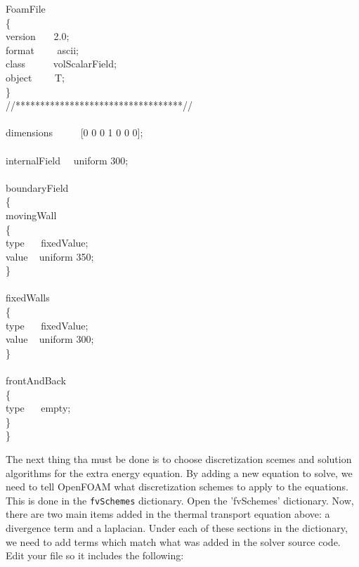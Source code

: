 \documentclass{article}
\newcommand\tab[1][0.5cm]{\hspace*{#1}}
\begin{document}
\begin{enumerate}[2.1]
\begin{myframe}
{	FoamFile\\
	\{\\
		\tab version\tab ~~~ 2.0;\\
		\tab format\tab ~~~~ ascii;\\
		\tab class\tab ~~~~~ volScalarField; \\
		\tab object\tab ~~~~ T; \\
	\} \\
	//**********************************// \\
	\\
	dimensions\tab\tab ~~~~~ [0 0 0 1 0 0 0];\\
	\\
	internalField\tab\tab ~~  uniform 300;\\
	\\
	boundaryField\\
	\{\\
	\tab movingWall\\
	\tab \{\\
		\tab \tab type \tab \tab   \tab ~~  fixedValue;\\
		\tab \tab value \tab \tab   \tab ~  uniform 350;\\
	\tab \}\\
	\\
	\tab fixedWalls\\
	\tab \{\\
		\tab \tab type    \tab \tab \tab  ~~ fixedValue;\\
		\tab \tab value  \tab \tab \tab  ~  uniform 300;\\
	\tab\}\\
	\\
	\tab frontAndBack\\
	\tab \{\\
		\tab \tab type   \tab \tab \tab   ~~  empty;\\
	\tab \}\\
	\}\\
	
	}
\end{myframe}
	
	
	The next thing tha must be done is to choose discretization scemes and solution algorithms for the extra energy equation. By adding a new equation to solve, we need to tell OpenFOAM what discretization schemes to apply to the equations. This is done in the {\tt fvSchemes} dictionary. Open the 'fvSchemes' dictionary. Now, there are two main items added in the thermal transport equation above: a divergence term and a laplacian. Under each of these sections in the dictionary, we need to add terms which match what was added in the solver source code. Edit your file so it includes the following: 
	

\end{enumerate}
\end{document}
